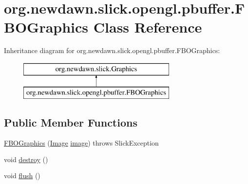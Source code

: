 \hypertarget{classorg_1_1newdawn_1_1slick_1_1opengl_1_1pbuffer_1_1_f_b_o_graphics}{}\section{org.\+newdawn.\+slick.\+opengl.\+pbuffer.\+F\+B\+O\+Graphics Class Reference}
\label{classorg_1_1newdawn_1_1slick_1_1opengl_1_1pbuffer_1_1_f_b_o_graphics}
Inheritance diagram for org.\+newdawn.\+slick.\+opengl.\+pbuffer.\+F\+B\+O\+Graphics\+:\begin{figure}[H]
\begin{center}
\leavevmode
\includegraphics[height=2.000000cm]{classorg_1_1newdawn_1_1slick_1_1opengl_1_1pbuffer_1_1_f_b_o_graphics}
\end{center}
\end{figure}
\subsection*{Public Member Functions}
\begin{DoxyCompactItemize}
\item 
\mbox{\hyperlink{classorg_1_1newdawn_1_1slick_1_1opengl_1_1pbuffer_1_1_f_b_o_graphics_ae5dc91e31ef5b22f6fc4cbe7f2f6ddb1}{F\+B\+O\+Graphics}} (\mbox{\hyperlink{classorg_1_1newdawn_1_1slick_1_1_image}{Image}} \mbox{\hyperlink{classorg_1_1newdawn_1_1slick_1_1opengl_1_1pbuffer_1_1_f_b_o_graphics_a7c88e67ddd520ec76bdc0082285ae909}{image}})  throws Slick\+Exception 
\item 
void \mbox{\hyperlink{classorg_1_1newdawn_1_1slick_1_1opengl_1_1pbuffer_1_1_f_b_o_graphics_a135d6b68519bec4c5a30fcd71ef66644}{destroy}} ()
\item 
void \mbox{\hyperlink{classorg_1_1newdawn_1_1slick_1_1opengl_1_1pbuffer_1_1_f_b_o_graphics_ac288010f13cfdf0797b9c331dc85607c}{flush}} ()
\end{DoxyCompactItemize}
